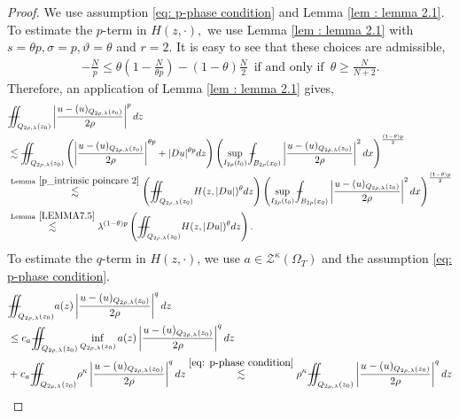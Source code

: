 \documentclass[notitlepage,11pt,reqno]{amsart}
\theoremstyle{definition}
\numberwithin{equation}{section}
\newcommand{\iintss}{{\int\hspace{-0.28cm}\int}}
\newcommand{ \miints }{{\iintss\hspace{-0.56cm} -\hspace{-0.15cm}-}}
\newcommand{\miint}[1]{{\miints_{\hspace{-0.13cm}#1}}}
\def\Xint#1{\mathchoice
	{\XXint\displaystyle\textstyle{#1}}%
	{\XXint\textstyle\scriptstyle{#1}}%
	{\XXint\scriptstyle\scriptscriptstyle{#1}}%
	{\XXint\scriptscriptstyle\scriptscriptstyle{#1}}%
	\!\int}
\def\XXint#1#2#3{{\setbox0=\hbox{$#1{#2#3}{\int}$}
		\vcenter{\hbox{$#2#3$}}\kern-.50\wd0}}
\def\Xint#1{\mathchoice
	{\XXint\displaystyle\textstyle{#1}}%
	{\XXint\textstyle\scriptstyle{#1}}%
	{\XXint\scriptstyle\scriptscriptstyle{#1}}%
	{\XXint\scriptscriptstyle\scriptscriptstyle{#1}}%
	\!\int}
\def\XXint#1#2#3{{\setbox0=\hbox{$#1{#2#3}{\int}$}
		\vcenter{\hbox{$#2#3$}}\kern-.50\wd0}}
\def\dashint{\Xint-}
\begin{document}
\begin{proof}
We use assumption \eqref{eq: p-phase condition} and Lemma \ref{lem : lemma 2.1}. To estimate the $p$-term in $H(z, \cdot),$ we use Lemma \ref{lem : lemma 2.1} with $s=\theta p, \sigma =p, \vartheta=\theta$ and $r=2.$ It is easy to see that these choices are admissible, 
\begin{align*}
-\frac{N}{p} \leq \theta \left(1-\frac{N}{\theta p}\right)-(1-\theta)\frac{N}{2} \,\,\, \text{if and only if}\,\,\, \theta \geq \frac{N}{N+2}.    
\end{align*}
Therefore, an application of Lemma \ref{lem : lemma 2.1} gives,
\begin{align}\label{eq: 4.8}
&\miint{Q_{2\rho, \lambda}(z_0)} \left|\frac{u-(u)_{Q_{2\rho, \lambda}(z_0)}}{2\rho}\right|^p dz \nonumber\\
&\lesssim \miint{Q_{2\rho, \lambda}(z_0)}\left(\left|\frac{u-(u)_{Q_{2\rho, \lambda}(z_0)}}{2\rho}\right|^{\theta p} + |D u|^{\theta p} dz\right)\left(\sup_{I_{2\rho}(t_0)}\dashint_{B_{2\rho}(x_0)}\left|\frac{u-(u)_{Q_{2\rho, \lambda}(z_0)}}{2\rho}\right|^2 dx\right)^{\frac{(1-\theta)p}{2}}\nonumber\\
&\overset{\text{Lemma}~\ref{p_intrinsic poincare 2}}{\lesssim} \left(\miint{Q_{2\rho, \lambda}(z_0)}H(z,|D u|)^{\theta} dz\right)\left(\sup_{I_{2\rho}(t_0)}\dashint_{B_{2\rho}(x_0)}\left|\frac{u-(u)_{Q_{2\rho, \lambda}(z_0)}}{2\rho}\right|^2 dx\right)^{\frac{(1-\theta)p}{2}}\nonumber\\
&\overset{\text{Lemma}~\ref{LEMMA7.5}}{\lesssim} \lambda^{(1-\theta)p} \left(\miint{Q_{2\rho, \lambda}(z_0)}H(z, |Du|)^{\theta} dz\right).
\end{align}
To estimate the $q$-term in $H(z, \cdot)$, we use $a\in \mathcal{Z}^{\kappa}(\Omega_T)$ and the assumption \eqref{eq: p-phase condition}.
\begin{align}\label{eq: 4.9}
&\miint{Q_{2\rho, \lambda}(z_0)} a(z)\left|\frac{u-(u)_{Q_{2\rho, \lambda}(z_0)}}{2\rho}\right|^q dz\nonumber\\
&\leq c_a \miint{Q_{2\rho, \lambda}(z_0)} \inf_{Q_{2\rho, \lambda}(z_0)}a(z) \left|\frac{u-(u)_{Q_{2\rho, \lambda}(z_0)}}{2\rho}\right|^q dz\nonumber\\
&+ c_a\miint{Q_{2\rho, \lambda}(z_0)} \rho^{\kappa} \left|\frac{u-(u)_{Q_{2\rho, \lambda}(z_0)}}{2\rho}\right|^q dz \overset{\eqref{eq: p-phase condition}}{\lesssim} \rho^{\kappa}\miint{Q_{2\rho, \lambda}(z_0)} \left|\frac{u-(u)_{Q_{2\rho, \lambda}(z_0)}}{2\rho}\right|^q dz\nonumber\\

\end{align}
\end{proof}
\end{document}
